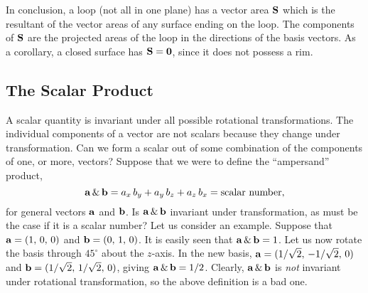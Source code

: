In conclusion, a loop (not all in one plane) has a vector area ${\bf S}$ which
is the resultant of the vector areas of any surface ending on the loop. The
components  of ${\bf S}$ are the projected areas of the loop in the
directions of  the basis vectors. As a corollary, a closed surface has ${\bf S} = {\bf 0}$,
since it does not possess a rim. 

\subsection{The Scalar Product}
A scalar quantity is invariant under all possible rotational transformations.
The individual components of a vector are not scalars because they change under
transformation. Can we form a scalar out of some combination of the components
of one, or more, vectors? Suppose that we were to define the
``ampersand''  product,
\begin{equation}
{\bf a}\,\&\,{\bf b} = a_x \,b_y + a_y \,b_z + a_z \,b_x = {\rm scalar~number},
\end{equation}
for general vectors ${\bf a}$ and ${\bf b}$. Is ${\bf a}\,\&\,{\bf b}$ 
invariant under transformation, as must be the case if it is a scalar number?
Let us consider an example. Suppose that ${\bf a} = (1,\,0,\,0)$ and
${\bf b} = (0,\,1,\,0)$. It is easily seen that ${\bf a}\,\&\,{\bf b}= 1$. Let
us now rotate the basis through $45^\circ$ about the $z$-axis. In the new
basis, ${\bf a} = (1/\sqrt{2},\, -1/\sqrt{2},\, 0)$ and ${\bf b} = (1/\sqrt{2},\,
1/\sqrt{2},\, 0)$, giving ${\bf a}\,\&\,{\bf b} = 1/2$. Clearly, ${\bf a}\,\&\,{\bf b}$
is {\em not} invariant under rotational transformation, so 
the above definition is a bad one.

